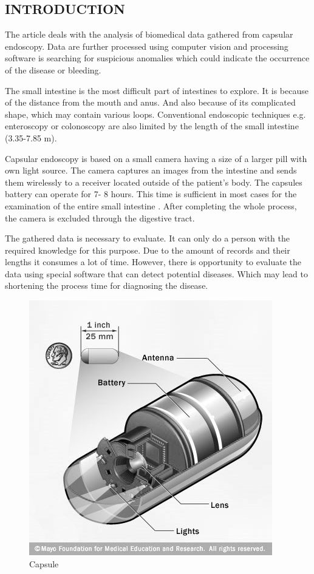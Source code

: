 \documentclass[twoside]{article}
\begin{document}
\begin{multicols}{2} %

\section{INTRODUCTION}

The article deals with the analysis of biomedical data gathered from capsular endoscopy. Data are further processed using computer vision and processing software is searching for suspicious anomalies which could indicate the occurrence of the disease or bleeding.

The small intestine is the most difficult part of intestines to explore. It is because of the distance from the mouth and anus. And also because of its complicated shape, which may contain various loops. Conventional endoscopic techniques e.g. enteroscopy or colonoscopy are also limited by the length of the small intestine (3.35-7.85 m)\cite{randomized}.


Capsular endoscopy is based on a small camera having a size of a larger pill with own light source. The camera captures an images from the intestine and sends them wirelessly to a receiver located outside of the patient's body. The capsules battery can operate for 7- 8 hours. This time is sufficient in most cases for the examination of the entire small intestine \cite{diagnosing}. After completing the whole process, the camera is excluded through the digestive tract.

The gathered data is necessary to evaluate. It can only do a person with the required knowledge for this purpose. Due to the amount of records and their lengths it consumes a lot of time. However, there is opportunity to evaluate the data using special software that can detect potential diseases. Which may lead to shortening the process time for diagnosing the disease.

\begin{figure}[H]
	\includegraphics[scale=0.5]{capsule}
	\centering
	\caption{Capsule \cite{capsule} \label{fig:capsule}}
\end{figure}


\end{multicols}
\end{document}
